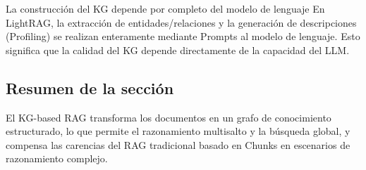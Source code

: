 \begin{knowledgebox}{La construcción del KG depende por completo del modelo de lenguaje}
En LightRAG, la extracción de entidades/relaciones y la generación de descripciones (Profiling) se realizan enteramente mediante Prompts al modelo de lenguaje. Esto significa que la calidad del KG depende directamente de la capacidad del LLM.
\end{knowledgebox}

\subsection{Resumen de la sección}

El KG-based RAG transforma los documentos en un grafo de conocimiento estructurado, lo que permite el razonamiento multisalto y la búsqueda global, y compensa las carencias del RAG tradicional basado en Chunks en escenarios de razonamiento complejo.

